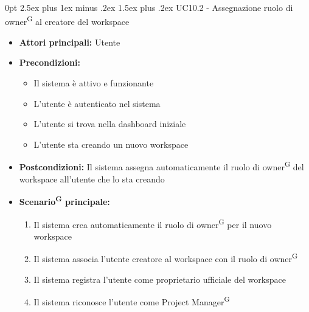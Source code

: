 \documentclass[a4paper, 11pt]{article}
\makeatletter
\renewcommand\paragraph{\@startsection{paragraph}{4}
  {0pt}
  {2.5ex plus 1ex minus .2ex}
  {1.5ex plus .2ex}
  {\normalfont\normalsize\bfseries\color{AccentDark}}}
\makeatother
\begin{document}
\paragraph{UC10.2 - Assegnazione ruolo di owner\textsuperscript{G} al creatore del workspace}\label{UC10.2}
\begin{itemize}
	\item \textbf{Attori principali:} Utente
	\item \textbf{Precondizioni:}
	\begin{itemize}
		\item Il sistema è attivo e funzionante
		\item L'utente è autenticato nel sistema
        \item L'utente si trova nella dashboard iniziale
        \item L'utente sta creando un nuovo workspace
	\end{itemize}
    \item \textbf{Postcondizioni:} Il sistema assegna automaticamente il ruolo di owner\textsuperscript{G} del workspace all'utente che lo sta creando
	\item \textbf{Scenario\textsuperscript{G} principale:}
    \begin{enumerate}
        \item Il sistema crea automaticamente il ruolo di owner\textsuperscript{G} per il nuovo workspace
        \item Il sistema associa l'utente creatore al workspace con il ruolo di owner\textsuperscript{G}
        \item Il sistema registra l'utente come proprietario ufficiale del workspace
        \item Il sistema riconosce l'utente come Project Manager\textsuperscript{G}
    \end{enumerate}

\end{itemize}
\end{document}
